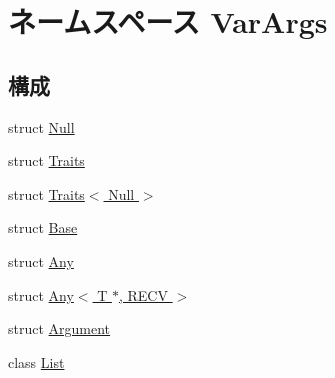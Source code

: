 \hypertarget{namespaceVarArgs}{
\section{ネームスペース VarArgs}
\label{namespaceVarArgs}
}
\subsection*{構成}
\begin{DoxyCompactItemize}
\item 
struct \hyperlink{structVarArgs_1_1Null}{Null}
\item 
struct \hyperlink{structVarArgs_1_1Traits}{Traits}
\item 
struct \hyperlink{structVarArgs_1_1Traits_3_01Null_01_4}{Traits$<$ Null $>$}
\item 
struct \hyperlink{structVarArgs_1_1Base}{Base}
\item 
struct \hyperlink{structVarArgs_1_1Any}{Any}
\item 
struct \hyperlink{structVarArgs_1_1Any_3_01T_01_5_00_01RECV_01_4}{Any$<$ T $\ast$, RECV $>$}
\item 
struct \hyperlink{structVarArgs_1_1Argument}{Argument}
\item 
class \hyperlink{classVarArgs_1_1List}{List}
\end{DoxyCompactItemize}
